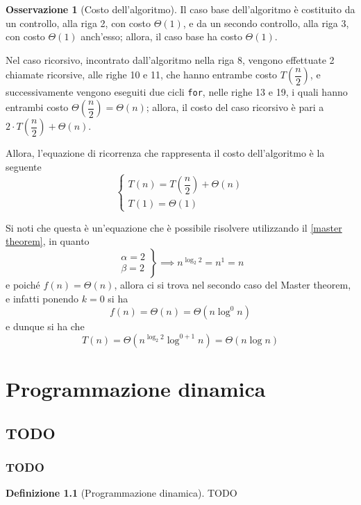 \documentclass[14pt]{extreport}
\theoremstyle{definition}
\newtheorem{definition}{Definizione}[subsection]
\theoremstyle{definition}
\newtheorem{remark}{Osservazione}[subsection]
\begin{document}
\begin{remark}[Costo dell'algoritmo]
    Il caso base dell'algoritmo è costituito da un controllo, alla riga 2, con costo $\Theta(1)$, e da un secondo controllo, alla riga 3, con costo $\Theta(1)$ anch'esso; allora, il caso base ha costo $\Theta(1)$.

    Nel caso ricorsivo, incontrato dall'algoritmo nella riga 8, vengono effettuate 2 chiamate ricorsive, alle righe 10 e 11, che hanno entrambe costo $T\left(\dfrac{n}{2}\right)$, e successivamente vengono eseguiti due cicli \texttt{for}, nelle righe 13 e 19, i quali hanno entrambi costo $\Theta\left(\dfrac{n}{2}\right) = \Theta(n)$; allora, il costo del caso ricorsivo è pari a $2 \cdot T\left(\dfrac{n}{2}\right) + \Theta(n)$.

    Allora, l'equazione di ricorrenza che rappresenta il costo dell'algoritmo è la seguente $$\left \{ \begin{array}{l} T(n) = T\left(\dfrac{n}{2}\right) + \Theta(n) \\ T(1) = \Theta(1) \end{array} \right .$$

    Si noti che questa è un'equazione che è possibile risolvere utilizzando il \cref{master theorem}, in quanto $$\left . \begin{array}{l} \alpha = 2 \\ \beta = 2 \end{array} \right \} \implies n ^ {\log_{2}{2}} = n^1 = n$$ e poiché $f(n) = \Theta(n)$, allora ci si trova nel secondo caso del Master theorem, e infatti ponendo $k = 0$ si ha $$f(n) = \Theta(n) = \Theta(n \log^0 n)$$ e dunque si ha che $$T(n) = \Theta(n ^{\log_{2}{2}} \log ^ {0 + 1}n) = \Theta(n \log n)$$
\end{remark}

\chapter{Programmazione dinamica}

\section{TODO}

\subsection{TODO}

\begin{definition}[Programmazione dinamica]
    TODO
\end{definition}
\end{document}
